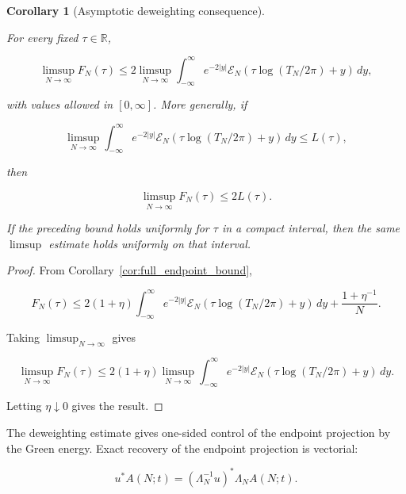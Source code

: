 \documentclass[11pt]{amsart}
\numberwithin{equation}{section}
\theoremstyle{plain}
\newtheorem{corollary}[theorem]{Corollary}
\theoremstyle{definition}
\theoremstyle{remark}
\begin{document}
\begin{corollary}[Asymptotic deweighting consequence]
\label{cor:asymptotic_deweighting_consequence}

For every fixed \(\tau\in\mathbb R\),

\begin{equation}
\limsup_{N\to\infty}F_N(\tau)
\le
2
\limsup_{N\to\infty}
\int_{-\infty}^{\infty}
e^{-2|y|}
\mathcal E_N(\tau\log(T_N/2\pi)+y)\,dy,
\label{eq:asymptotic_deweighting_consequence}
\end{equation}

with values allowed in \([0,\infty]\). More generally, if

\begin{equation}
\limsup_{N\to\infty}
\int_{-\infty}^{\infty}
e^{-2|y|}
\mathcal E_N(\tau\log(T_N/2\pi)+y)\,dy
\le L(\tau),
\end{equation}

then

\begin{equation}
\limsup_{N\to\infty}F_N(\tau)
\le
2L(\tau).
\end{equation}

If the preceding bound holds uniformly for \(\tau\) in a compact
interval, then the same \(\limsup\) estimate holds uniformly on that
interval.
\end{corollary}

\begin{proof}
From Corollary~\ref{cor:full_endpoint_bound},

\begin{equation}
F_N(\tau)
\le
2(1+\eta)
\int_{-\infty}^{\infty}
e^{-2|y|}
\mathcal E_N(\tau\log(T_N/2\pi)+y)\,dy
+
\frac{1+\eta^{-1}}{N}.
\end{equation}

Taking \(\limsup_{N\to\infty}\) gives

\begin{equation}
\limsup_{N\to\infty}F_N(\tau)
\le
2(1+\eta)
\limsup_{N\to\infty}
\int_{-\infty}^{\infty}
e^{-2|y|}
\mathcal E_N(\tau\log(T_N/2\pi)+y)\,dy.
\end{equation}

Letting \(\eta\downarrow0\) gives the result.
\end{proof}

The deweighting estimate gives one-sided control of the endpoint
projection by the Green energy. Exact recovery of the endpoint
projection is vectorial:

\begin{equation}
u^*A(N;t)
=
(\Lambda_N^{-1}u)^*
\Lambda_NA(N;t).
\label{eq:vectorial_endpoint_recovery}
\end{equation}
\end{document}
